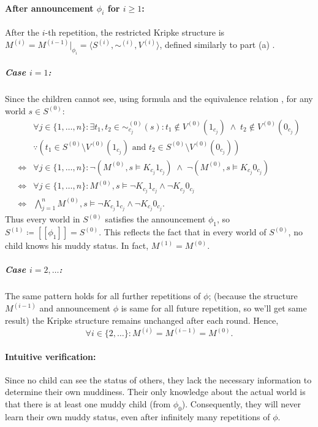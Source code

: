\paragraph*{After announcement $\phi_i$ for $i \ge 1$:}
After the $i$-th repetition, the restricted Kripke structure is 
\( M^{(i)} = M^{(i-1)}|_{\phi_i} = 
    \langle S^{(i)}, \sim^{(i)}, V^{(i)} \rangle \), defined 
similarly to part (a) .

\subparagraph{Case $i=1$:} 
Since the children cannot see, using formula  and the 
equivalence relation , for any world \( s \in S^{(0)} \):
\begin{align*}
    &\forall j \in \{1,\dots,n\}: 
        \exists t_1, t_2 \in \sim_{c_j}^{(0)}(s): 
        t_1 \notin V^{(0)}(1_{c_j}) \;\land\; t_2 \notin V^{(0)}(0_{c_j}) \\
        &\because (t_1 \in S^{(0)} \setminus V^{(0)}(1_{c_j}) \text{ and }
         t_2 \in S^{(0)} \setminus V^{(0)}(0_{c_j})) \\
    \iff &\forall j \in \{1,\dots,n\}: 
        \neg (M^{(0)}, s \models K_{c_j}1_{c_j}) 
        \;\land\; \neg (M^{(0)}, s \models K_{c_j}0_{c_j}) \\
    \iff &\forall j \in \{1,\dots,n\}: 
        M^{(0)}, s \models \neg K_{c_j}1_{c_j} \land \neg K_{c_j}0_{c_j} \\
    \iff &\bigwedge_{j=1}^{n} M^{(0)}, s \models \neg K_{c_j}1_{c_j} 
        \land \neg K_{c_j}0_{c_j}.
\end{align*}
Thus every world in \( S^{(0)} \) satisfies the announcement \(\phi_1\), so 
\( S^{(1)} \coloneqq [\![ \phi_1 ]\!] = S^{(0)} \). This reflects the fact 
that in every world of \( S^{(0)} \), no child knows his muddy status. 
In fact, \( M^{(1)} = M^{(0)} \).

\subparagraph{Case $i=2,\dots$:} 
The same pattern holds for all further repetitions of \(\phi\); 
(because the structure $M^{(i-1)}$ and announcement $\phi$ is
same for all future repetition, so we'll get same result)
the Kripke 
structure remains unchanged after each round. Hence,
\[
\forall i \in \{2,\dots\}: M^{(i)} = M^{(i-1)} = M^{(0)}.
\]

\paragraph{Intuitive verification:} Since no child can see the status of 
others, they lack the necessary information to determine their own 
muddiness. Their only knowledge about the actual world is that there 
is at least one muddy child (from \(\phi_0\)). Consequently, they will 
never learn their own muddy status, even after infinitely many repetitions 
of \(\phi\).

